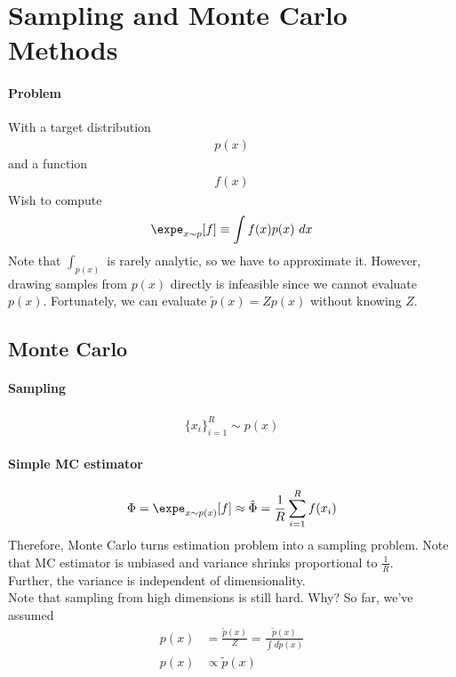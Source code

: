 \documentclass{article}
\begin{document}
	\section{Sampling and Monte Carlo Methods}
	\paragraph{Problem} With a target distribution
	\begin{align}
		p(x)
	\end{align}
	and a function
	\begin{align}
		f(x)
	\end{align}
	Wish to compute
	\begin{align}
		\expe_{x \sim p} [f] \equiv \int f(x) p(x)\ dx
	\end{align}
	Note that $\int_{p(x)}$ is rarely analytic, so we have to approximate it. However, drawing samples from $p(x)$ directly is infeasible since we cannot evaluate $p(x)$. Fortunately, we can evaluate $\tilde{p}(x) = Z p(x)$ without knowing $Z$.

	\subsection{Monte Carlo}
	\paragraph{Sampling}
	\begin{align}
		\{x_i\}_{i=1}^R \sim p(x)
	\end{align}
	\paragraph{Simple MC estimator}
	\begin{align}
		\Phi = \expe_{x \sim p(x)}[f] \approx \hat{\Phi} = \frac{1}{R} \sum_{i=1}^R f(x_i)
	\end{align}
	Therefore, Monte Carlo turns estimation problem into a sampling problem.
	Note that MC estimator is unbiased and variance shrinks proportional to $\frac{1}{R}$. \\
	Further, the variance is independent of dimensionality. \\
	Note that sampling from high dimensions is still hard. Why? So far, we've assumed 
	\begin{align}
		p(x) &= \frac{\tilde{p}(x)}{Z} = \frac{\tilde{p}(x)}{\int d\tilde{p}(x)} \\
		p(x) &\propto \tilde{p}(x)
	\end{align}
\end{document}
